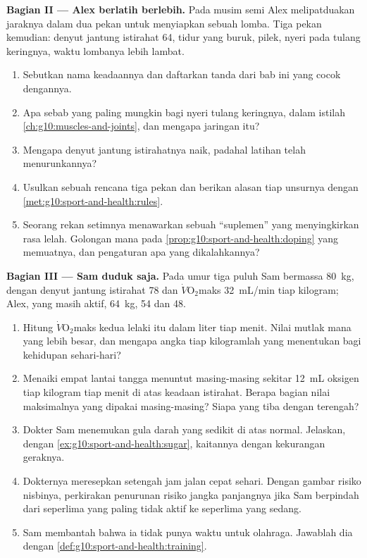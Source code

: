 \begin{problem}
\medskip
\noindent\textbf{Bagian II --- Alex berlatih berlebih.}
Pada musim semi Alex melipatduakan jaraknya dalam dua pekan untuk
menyiapkan sebuah lomba. Tiga pekan kemudian: denyut jantung istirahat
64, tidur yang buruk, pilek, nyeri pada tulang keringnya, waktu
lombanya lebih lambat.
\begin{enumerate}[resume]
  \item Sebutkan nama keadaannya dan daftarkan tanda dari bab ini yang
        cocok dengannya.
  \item Apa sebab yang paling mungkin bagi nyeri tulang keringnya,
        dalam istilah \cref{ch:g10:muscles-and-joints}, dan mengapa
        jaringan itu?
  \item Mengapa denyut jantung istirahatnya naik, padahal latihan telah
        menurunkannya?
  \item Usulkan sebuah rencana tiga pekan dan berikan alasan tiap
        unsurnya dengan \cref{met:g10:sport-and-health:rules}.
  \item Seorang rekan setimnya menawarkan sebuah ``suplemen'' yang
        menyingkirkan rasa lelah. Golongan mana pada
        \cref{prop:g10:sport-and-health:doping} yang memuatnya, dan
        pengaturan apa yang dikalahkannya?
\end{enumerate}

\medskip
\noindent\textbf{Bagian III --- Sam duduk saja.}
Pada umur tiga puluh Sam bermassa \qty{80}{kg}, dengan denyut jantung
istirahat 78 dan $\dot V\!\mathrm{O_2}$maks \qty{32}{mL/min} tiap
kilogram; Alex, yang masih aktif, \qty{64}{kg}, 54 dan \num{48}.
\begin{enumerate}[resume]
  \item Hitung $\dot V\!\mathrm{O_2}$maks kedua lelaki itu dalam liter
        tiap menit. Nilai mutlak mana yang lebih besar, dan mengapa
        angka tiap kilogramlah yang menentukan bagi kehidupan
        sehari-hari?
  \item Menaiki empat lantai tangga menuntut masing-masing sekitar
        \qty{12}{mL} oksigen tiap kilogram tiap menit di atas keadaan
        istirahat. Berapa bagian nilai maksimalnya yang dipakai
        masing-masing? Siapa yang tiba dengan terengah?
  \item Dokter Sam menemukan gula darah yang sedikit di atas normal.
        Jelaskan, dengan \cref{ex:g10:sport-and-health:sugar},
        kaitannya dengan kekurangan geraknya.
  \item Dokternya meresepkan setengah jam jalan cepat sehari. Dengan
        gambar risiko nisbinya, perkirakan penurunan risiko jangka
        panjangnya jika Sam berpindah dari seperlima yang paling tidak
        aktif ke seperlima yang sedang.
  \item Sam membantah bahwa ia tidak punya waktu untuk olahraga.
        Jawablah dia dengan \cref{def:g10:sport-and-health:training}.
\end{enumerate}


\end{problem}
